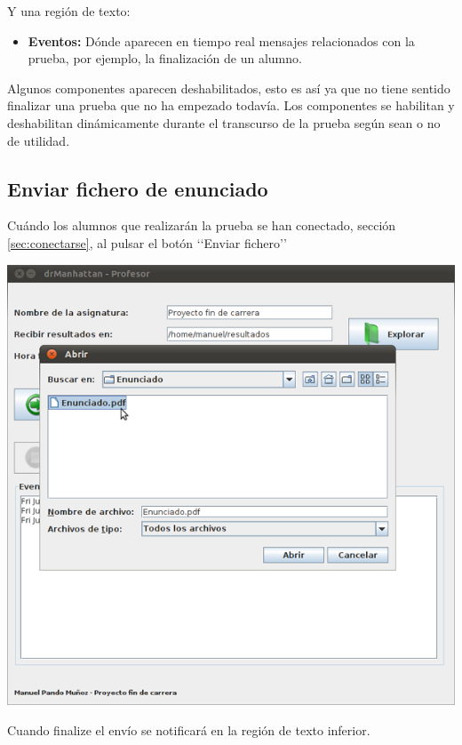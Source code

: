\documentclass[11pt]{article}
\begin{document}
Y una región de texto:

\begin{itemize}
    \item {\bfseries Eventos:} Dónde aparecen en tiempo real mensajes relacionados con la prueba, por ejemplo, la finalización de un alumno.
\end{itemize}

Algunos componentes aparecen deshabilitados, esto es así ya que no tiene sentido finalizar una prueba que no ha empezado todavía. Los componentes se habilitan y deshabilitan dinámicamente durante el transcurso de la prueba según sean o no de utilidad.


\subsection{Enviar fichero de enunciado}

Cuándo los alumnos que realizarán la prueba se han conectado, sección \ref{sec:conectarse}, al pulsar el botón \lq\lq Enviar fichero\rq\rq

\begin{center}
    \includegraphics[width=.90\linewidth]{imagenes/enviar}
\end{center}

Cuando finalize el envío se notificará en la región de texto inferior.
\end{document}
